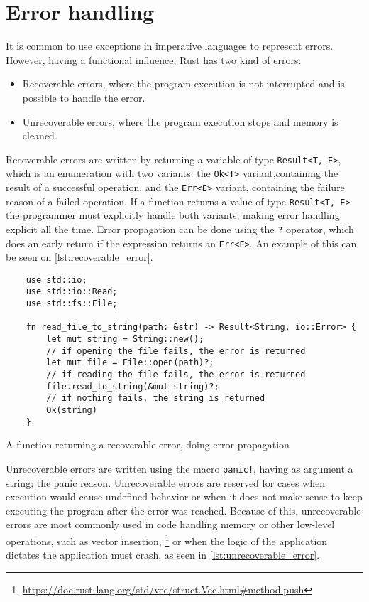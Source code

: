 \section{Error handling}
It is common to use exceptions in imperative languages to represent errors. However, having a functional influence, Rust has two kind of errors: 
\begin{itemize}
    \item Recoverable errors, where the program execution is not interrupted and is possible to handle the error.
    \item Unrecoverable errors, where the program execution stops and memory is cleaned.
\end{itemize}

Recoverable errors are written by returning a variable of type \texttt{Result<T, E>}, which is an enumeration with two variants: the \texttt{Ok<T>} variant,containing the result of a successful operation, and the \texttt{Err<E>} variant, containing the failure reason of a failed operation. If a function returns a value of type \texttt{Result<T, E>} the programmer must explicitly handle both variants, making error handling explicit all the time. Error propagation can be done using the \texttt{?} operator, which does an early return if the expression returns an \texttt{Err<E>}. An example of this can be seen on \ref{lst:recoverable_error}.

\begin{listing}[ht]
	\begin{verbatim}
    use std::io;
    use std::io::Read;
    use std::fs::File;

    fn read_file_to_string(path: &str) -> Result<String, io::Error> {
        let mut string = String::new();
        // if opening the file fails, the error is returned
        let mut file = File::open(path)?;
        // if reading the file fails, the error is returned
        file.read_to_string(&mut string)?;
        // if nothing fails, the string is returned
        Ok(string)
    }
    \end{verbatim}
  \caption{A function returning a recoverable error, doing error propagation}
  \label{lst:recoverable_error}
\end{listing}

Unrecoverable errors are written using the macro \texttt{panic!}, having as argument a string; the panic reason. Unrecoverable errors are reserved for cases when execution would cause undefined behavior or when it does not make sense to keep executing the program after the error was reached. Because of this, unrecoverable errors are most commonly used in code handling memory or other low-level operations, such as vector insertion, \footnote{\url{https://doc.rust-lang.org/std/vec/struct.Vec.html\#method.push}} or when the logic of the application dictates the application must crash, as seen in \ref{lst:unrecoverable_error}.


